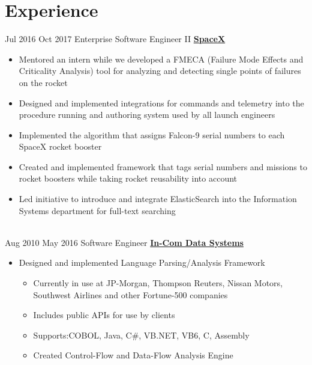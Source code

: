 \documentclass[letterpaper]{resume}
\begin{document}
	
\makeprofile %

\section{Experience}
\begin{twenty}
	\twentyitem
	{Jul 2016}
	{Oct 2017}
	{Enterprise Software Engineer II}
	{\href{http://www.spacex.com/}{\textbf{SpaceX}}}
	{}
	{\begin{itemize}
		\item Mentored an intern while we developed a FMECA (Failure Mode Effects and Criticality Analysis) tool for analyzing and detecting single points of failures on the rocket
		
		\item Designed and implemented integrations for commands and telemetry into the procedure running and authoring system used by all launch engineers
		
		\item Implemented the algorithm that assigns Falcon-9 serial numbers to each SpaceX rocket booster
		
		\item Created and implemented framework that tags serial numbers and missions to rocket boosters while taking rocket reusability into account
		
		\item Led initiative to introduce and integrate ElasticSearch into the Information Systems department for full-text searching
	\end{itemize}}
	
	\\
	
	\twentyitem
	{Aug 2010}
	{May 2016}
	{Software Engineer}
	{\href{http://in-com.com/}{\textbf{In-Com Data Systems}}}
	{}
	{
		\begin{itemize}
			\item Designed and implemented Language Parsing/Analysis Framework {}
			
			\begin{itemize}
			\item Currently in use at JP-Morgan, Thompson Reuters, Nissan Motors, Southwest Airlines and other Fortune-500 companies
			
			\item Includes public APIs for use by clients
			
			\item Supports:COBOL, Java, C\#, VB.NET, VB6, C, Assembly
			
			\item Created Control-Flow and Data-Flow Analysis Engine
			
		\end{itemize}
		\end{itemize}
	}
\end{twenty}
\end{document}
